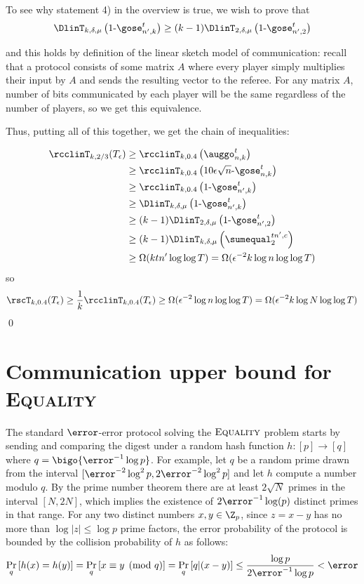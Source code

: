 	{\color{black} To see why statement 4) in the overview is true, we wish to prove that
	$$ \DlinT_{k,\delta,\mu}\left(1\text{-}\gose_{n',k}^t\right)\ge (k-1) \DlinT_{2,\delta,\mu}\left(1\text{-}\gose_{n',2}^t\right)$$
	
	and this holds by definition of the linear sketch model of communication: recall that a protocol consists of some matrix $A$ where every player simply multiplies their input by $A$ and sends the resulting vector to the referee. For any matrix $A$, number of bits communicated by each player will be the same regardless of the number of players, so we get this equivalence.} %
	
	Thus, {\color{black} putting all of this together, we get the chain of inequalities:}
	
	\begin{align*}
	\rcclinT_{k,2/3}(T_\epsilon) &\ge \rcclinT_{k,0.4}\left( \auggo_{n,k}^{t} \right)\\
	&\ge \rcclinT_{k,0.4}\left(10\epsilon\sqrt{n}\text{-}\gose_{n,k}^t\right)\\
	&\ge \rcclinT_{k,0.4}\left(1\text{-}\gose_{n',k}^t\right)\\
	&\ge \DlinT_{k,\delta,\mu}\left(1\text{-}\gose_{n',k}^t\right)\\
	&\ge (k-1) \DlinT_{2,\delta,\mu}\left(1\text{-}\gose_{n',2}^t\right)\\
	&\ge (k-1) \DlinT_{k,\delta,\mu}\left(\sumequal_{2}^{tn',c}\right)\\
	&\ge \Omega(ktn' \log \log T) = \Omega(\epsilon^{-2} k\log n \log \log T)
	\end{align*}
	so
	$$\rscT_{k,0.4}(T_\epsilon) \ge \frac{1}{k} \rcclinT_{k,0.4}(T_\epsilon) \ge \Omega(\epsilon^{-2} \log n \log \log T) = \Omega(\epsilon^{-2} k \log N \log \log T)$$
	\qed

\appendix

%


\section{Communication upper bound for \textsc{Equality}}
\label{sec:testing equality}


The standard $\error$-error protocol solving the $\textsc{Equality}$ problem starts by sending and comparing the digest under a random hash function $h:[p]\to [q]$ where $q=\bigo{\error^{-1}\log p}$. 
For example, let $q$ be a random prime drawn from the interval $[\error^{-2}\log^2 p, 2\error^{-2}\log^2 p]$ and let $h$ compute a number modulo $q$.
By the prime number theorem there are at least $2\sqrt{N}$ primes in the interval $[N,2N]$, 
which implies the existence of $2\error^{-1}\log(p)$ distinct primes in that range. 
%
For any two distinct numbers $x,y\in \Z_p$,  since $z=x-y$ has no more than $\log|z|\le \log p$ prime factors, the error probability of the protocol is bounded by the collision probability of $h$ as follows:
%
\[
\Pr_q\left[h(x)= h(y) \right]=\Pr_q\left[x\equiv y \pmod q \right]=\Pr_q\left[q | (x-y) \right] \le \frac{\log p}{2\error^{-1}\log p} <\error
\]
%

